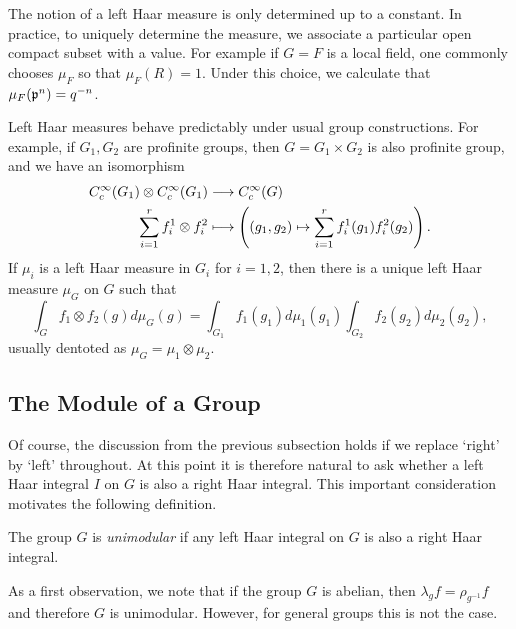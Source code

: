\begin{example}
    The notion of a left Haar measure is only determined up to a constant. In practice, to uniquely determine the measure, we associate a particular open compact subset with a value. For example if $G=F$ is a local field, one commonly chooses $\mu_F$ so that $\mu_F(R)=1$. Under this choice, we calculate that $\mu_F(\mathfrak{p}^n)=q^{-n}$.
\end{example}

Left Haar measures behave predictably under usual group constructions. For example, if $G_1,G_2$ are profinite groups, then $G=G_1\times G_2$ is also profinite group, and we have an isomorphism 
\begin{align*}
    C_c^{\infty}(G_1)\otimes C_c^{\infty}(G_1)&\longrightarrow C_c^{\infty}(G)\\
    \sum_{i=1}^{r}f_i^1\otimes f_i^2 &\longmapsto \left((g_1,g_2)\mapsto \sum_{i=1}^{r}f_i^1(g_1)f_i^2(g_2)\right).
\end{align*}
If $\mu_i$ is a left Haar measure in $G_i$ for $i=1,2$, then there is a unique left Haar measure $\mu_G$ on $G$ such that 
$$\int_G f_1\otimes f_2(g)d\mu_G(g)=\int_{G_1}f_1(g_1)d\mu_1(g_1)\int_{G_2}f_2(g_2)d\mu_2(g_2),$$
usually dentoted as $\mu_G=\mu_1\otimes\mu_2$.

\subsection{The Module of a Group}

Of course, the discussion from the previous subsection holds if we replace `right' by `left' throughout. At this point it is therefore natural to ask whether a left Haar integral $I$ on $G$ is also a right Haar integral. This important consideration motivates the following definition.

\begin{defn}
    The group $G$ is \textit{unimodular} if any left Haar integral on $G$ is also a right Haar integral. 
\end{defn}

As a first observation, we note that if the group $G$ is abelian, then $\lambda_g f=\rho_{g^{-1}} f$ and therefore $G$ is unimodular. However, for general groups this is not the case. 

